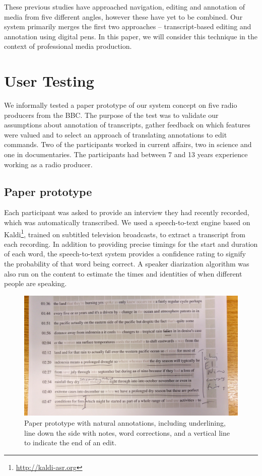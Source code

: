 These previous studies have approached navigation, editing and annotation of
media from five different angles, however these have yet to be combined.
Our system primarily merges the first two approaches -- transcript-based editing
and annotation using digital pens. In this paper, we will consider this
technique in the context of professional media production.

\section{User Testing}
We informally tested a paper prototype of our system concept on five radio
producers from the BBC. The purpose of the test was to validate our assumptions
about annotation of transcripts, gather feedback on which features were valued
and to select an approach of translating annotations to edit commands.
Two of the participants worked in current affairs, two in science and one in
documentaries. The participants had between 7 and 13 years experience working as
a radio producer.

\subsection{Paper prototype}
Each participant was asked to provide an interview they had recently recorded,
which was automatically transcribed.  We used a speech-to-text engine based on
Kaldi\footnote{\url{http://kaldi-asr.org}}, trained on subtitled television
broadcasts, to extract a transcript from each recording. In addition to
providing precise timings for the start and duration of each word, the
speech-to-text system provides a confidence rating to signify the probability
of that word being correct. A speaker diarization \citep{AngueraMiro2012}
algorithm was also run on the content to estimate the times and
identities of when different people are speaking.

\begin{figure}[h]
  \centering
  \includegraphics[width=\columnwidth]{figs/mockup}
  \caption{Paper prototype with natural annotations, including
    underlining, line down the side with notes, word corrections, and a
    vertical line to indicate the end of an edit.}
  \label{fig:natural}
\end{figure}

